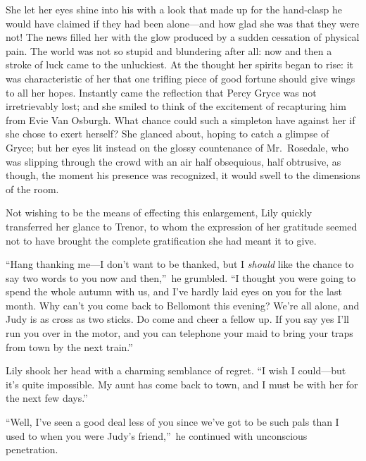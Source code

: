 \documentclass[12pt,a4paper]{book}
\begin{document}
She let her eyes shine into his with a look that made up for the
hand-clasp he would have claimed if they had been alone---and how
glad she was that they were not! The news filled her with the
glow produced by a sudden cessation of physical pain. The world
was not so stupid and blundering after all: now and then a stroke
of luck came to the unluckiest. At the thought her spirits began
to rise: it was characteristic of her that one trifling piece of
good fortune should give wings to all her hopes. Instantly came
the reflection that Percy Gryce was not irretrievably
lost; and she smiled to think of the excitement of recapturing
him from Evie Van Osburgh. What chance could such a simpleton
have against her if she chose to exert herself? She glanced
about, hoping to catch a glimpse of Gryce; but her eyes lit
instead on the glossy countenance of Mr.\ Rosedale, who was
slipping through the crowd with an air half obsequious, half
obtrusive, as though, the moment his presence was recognized, it
would swell to the dimensions of the room.





Not wishing to be the means of effecting this enlargement, Lily
quickly transferred her glance to Trenor, to whom the expression
of her gratitude seemed not to have brought the complete
gratification she had meant it to give.





``Hang thanking me---I don't want to be thanked, but I \textit{should} like
the chance to say two words to you now and then,''\ he grumbled. ``I
thought you were going to spend the whole autumn with us, and
I've hardly laid eyes on you for the last month. Why can't you
come back to Bellomont this evening? We're all alone, and Judy is
as cross as two sticks. Do come and cheer a fellow up. If you say
yes I'll run you over in the motor, and you can telephone your
maid to bring your traps from town by the next train.''





Lily shook her head with a charming semblance of regret. ``I wish
I could---but it's quite impossible. My aunt has come back to
town, and I must be with her for the next few days.''





``Well, I've seen a good deal less of you since we've got to be
such pals than I used to when you were Judy's friend,''\ he
continued with unconscious penetration.
\end{document}
